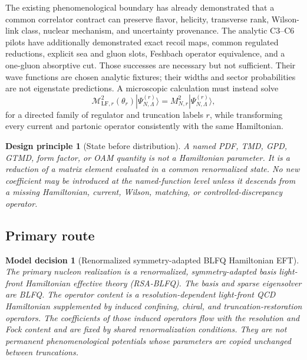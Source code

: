 \documentclass[11pt]{article}
\newtheorem{principle}[definition]{Design principle}
\newtheorem{decision}[definition]{Model decision}
\newcommand{\LF}{\ensuremath{\mathrm{LF}}}
\newcommand{\cM}{\mathcal M}
\begin{document}
The existing phenomenological boundary has already demonstrated that a common
correlator contract can preserve flavor, helicity, transverse rank, Wilson-link
class, nuclear mechanism, and uncertainty provenance.  The analytic C3--C6
pilots have additionally demonstrated exact recoil maps, common regulated
reductions, explicit sea and gluon slots, Feshbach operator equivalence, and a
one-gluon absorptive cut.  Those successes are necessary but not sufficient.
Their wave functions are chosen analytic fixtures; their widths and sector
probabilities are not eigenstate predictions.  A microscopic calculation must
instead solve
\begin{equation}
 \cM_{\LF,r}^{2}(\theta_r)
 |\Psi_{N,\Lambda}^{(r)}\rangle
 =M_{N,r}^{2}|\Psi_{N,\Lambda}^{(r)}\rangle,
 \label{eq:master-eigenproblem}
\end{equation}
for a directed family of regulator and truncation labels \(r\), while
transforming every current and partonic operator consistently with the same
Hamiltonian.

\begin{principle}[State before distribution]
A named PDF, TMD, GPD, GTMD, form factor, or OAM quantity is not a Hamiltonian
parameter.  It is a reduction of a matrix element evaluated in a common
renormalized state.  No new coefficient may be introduced at the named-function
level unless it descends from a missing Hamiltonian, current, Wilson, matching,
or controlled-discrepancy operator.
\label{pr:state-before-distribution}
\end{principle}

\subsection{Primary route}

\begin{decision}[Renormalized symmetry-adapted BLFQ Hamiltonian EFT]
The primary nucleon realization is a \emph{renormalized,
symmetry-adapted basis light-front Hamiltonian effective theory} (RSA-BLFQ).
The basis and sparse eigensolver are BLFQ.  The operator content is a
resolution-dependent light-front QCD Hamiltonian supplemented by induced
confining, chiral, and truncation-restoration operators.  The coefficients of
those induced operators flow with the resolution and Fock content and are
fixed by shared renormalization conditions.  They are not permanent
phenomenological potentials whose parameters are copied unchanged between
truncations.
\label{dec:primary-route}
\end{decision}
\end{document}
